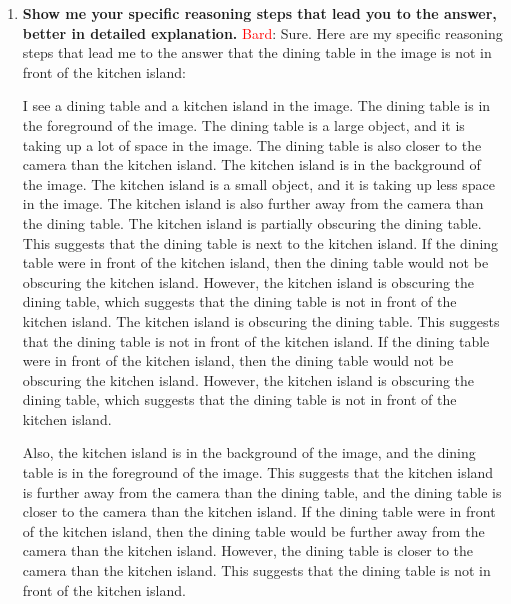 \begin{enumerate}
    Therefore, the dining table in the image is not in front of the kitchen island. The dining table is next to the kitchen island.
    \subitem \textcolor{red}{Visual ChatGPT}: The dinning table is located near the kitchen island, and the two are separated by a few feet. From the observation of the image, it appears that the dinning table is not in front of the kitchen island.
    \subitem MiniGPT-4: No, the dinning table is in the same room as the kitchen island but it is not in front of it.
    \item \textbf{Show me your specific reasoning steps that lead you to the answer, better in detailed explanation.}
    \subitem \textcolor{Red}{Bard}: 
    Sure. Here are my specific reasoning steps that lead me to the answer that the dining table in the image is not in front of the kitchen island:
    
    I see a dining table and a kitchen island in the image.
    The dining table is in the foreground of the image. The dining table is a large object, and it is taking up a lot of space in the image. The dining table is also closer to the camera than the kitchen island.
    The kitchen island is in the background of the image. The kitchen island is a small object, and it is taking up less space in the image. The kitchen island is also further away from the camera than the dining table.
    The kitchen island is partially obscuring the dining table. This suggests that the dining table is next to the kitchen island.
    If the dining table were in front of the kitchen island, then the dining table would not be obscuring the kitchen island. However, the kitchen island is obscuring the dining table, which suggests that the dining table is not in front of the kitchen island.
    The kitchen island is obscuring the dining table. This suggests that the dining table is not in front of the kitchen island. If the dining table were in front of the kitchen island, then the dining table would not be obscuring the kitchen island. However, the kitchen island is obscuring the dining table, which suggests that the dining table is not in front of the kitchen island.
    
    Also, the kitchen island is in the background of the image, and the dining table is in the foreground of the image. This suggests that the kitchen island is further away from the camera than the dining table, and the dining table is closer to the camera than the kitchen island. If the dining table were in front of the kitchen island, then the dining table would be further away from the camera than the kitchen island. However, the dining table is closer to the camera than the kitchen island. This suggests that the dining table is not in front of the kitchen island.
    

\end{enumerate}
